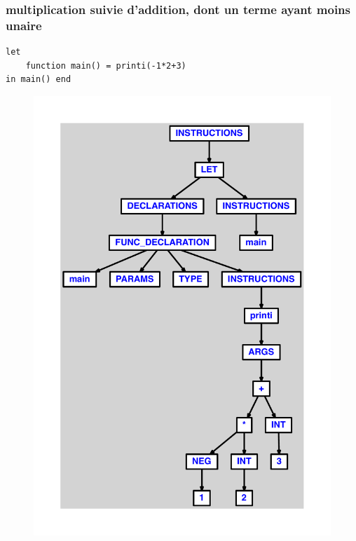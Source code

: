 \documentclass{article}
\begin{document}
\subsubsection{multiplication suivie d'addition, dont un terme ayant moins unaire}
\begin{lstlisting}
let
	function main() = printi(-1*2+3)
in main() end
\end{lstlisting}
\newpage
\begin{figure}[H]
\centering
\includegraphics[max width=\textwidth]{ast/ast_71.pdf}
\end{figure}
\newpage
\end{document}
